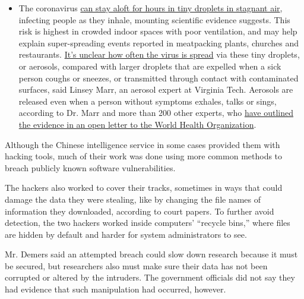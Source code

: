 \begin{itemize}
  \begin{itemize}
  \tightlist
  \item
    The coronavirus
    \href{https://www.nytimes3xbfgragh.onion/2020/07/04/health/239-experts-with-one-big-claim-the-coronavirus-is-airborne.html?action=click\&pgtype=Article\&state=default\&region=MAIN_CONTENT_3\&context=storylines_faq}{can
    stay aloft for hours in tiny droplets in stagnant air}, infecting
    people as they inhale, mounting scientific evidence suggests. This
    risk is highest in crowded indoor spaces with poor ventilation, and
    may help explain super-spreading events reported in meatpacking
    plants, churches and restaurants.
    \href{https://www.nytimes3xbfgragh.onion/2020/07/06/health/coronavirus-airborne-aerosols.html?action=click\&pgtype=Article\&state=default\&region=MAIN_CONTENT_3\&context=storylines_faq}{It's
    unclear how often the virus is spread} via these tiny droplets, or
    aerosols, compared with larger droplets that are expelled when a
    sick person coughs or sneezes, or transmitted through contact with
    contaminated surfaces, said Linsey Marr, an aerosol expert at
    Virginia Tech. Aerosols are released even when a person without
    symptoms exhales, talks or sings, according to Dr. Marr and more
    than 200 other experts, who
    \href{https://academic.oup.com/cid/article/doi/10.1093/cid/ciaa939/5867798}{have
    outlined the evidence in an open letter to the World Health
    Organization}.
  \end{itemize}
\end{itemize}

Although the Chinese intelligence service in some cases provided them
with hacking tools, much of their work was done using more common
methods to breach publicly known software vulnerabilities.

The hackers also worked to cover their tracks, sometimes in ways that
could damage the data they were stealing, like by changing the file
names of information they downloaded, according to court papers. To
further avoid detection, the two hackers worked inside computers'
``recycle bins,'' where files are hidden by default and harder for
system administrators to see.

Mr. Demers said an attempted breach could slow down research because it
must be secured, but researchers also must make sure their data has not
been corrupted or altered by the intruders. The government officials did
not say they had evidence that such manipulation had occurred, however.

